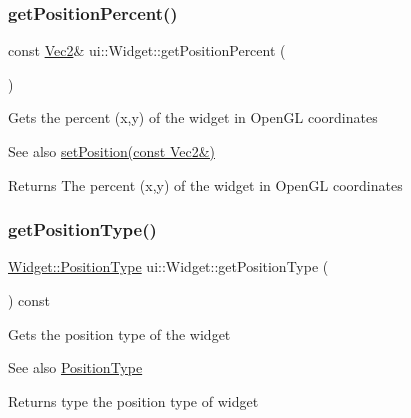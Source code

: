 \subsubsection{\texorpdfstring{get\+Position\+Percent()}{getPositionPercent()}\hspace{0.1cm}{\footnotesize\ttfamily [2/2]}}
{\footnotesize\ttfamily const \hyperlink{classVec2}{Vec2}\& ui\+::\+Widget\+::get\+Position\+Percent (\begin{DoxyParamCaption}{ }\end{DoxyParamCaption})}

Gets the percent (x,y) of the widget in Open\+GL coordinates

\begin{DoxySeeAlso}{See also}
\hyperlink{classui_1_1Widget_ad1983665a8a2463e77c9ff7e13fcac97}{set\+Position(const Vec2\&)}
\end{DoxySeeAlso}
\begin{DoxyReturn}{Returns}
The percent (x,y) of the widget in Open\+GL coordinates 
\end{DoxyReturn}
\mbox{\label{classui_1_1Widget_a5169e45d16e1aa2c6d692939882b1879}} 
\subsubsection{\texorpdfstring{get\+Position\+Type()}{getPositionType()}\hspace{0.1cm}{\footnotesize\ttfamily [1/2]}}
{\footnotesize\ttfamily \hyperlink{classui_1_1Widget_acfb8004ec169575dab6d3e8eb3e92b90}{Widget\+::\+Position\+Type} ui\+::\+Widget\+::get\+Position\+Type (\begin{DoxyParamCaption}{ }\end{DoxyParamCaption}) const}

Gets the position type of the widget

\begin{DoxySeeAlso}{See also}
{\ttfamily \hyperlink{classui_1_1Widget_acfb8004ec169575dab6d3e8eb3e92b90}{Position\+Type}}
\end{DoxySeeAlso}
\begin{DoxyReturn}{Returns}
type the position type of widget 
\end{DoxyReturn}
\mbox{\label{classui_1_1Widget_a677e31ede510db02cd4781b32703ea95}} 
